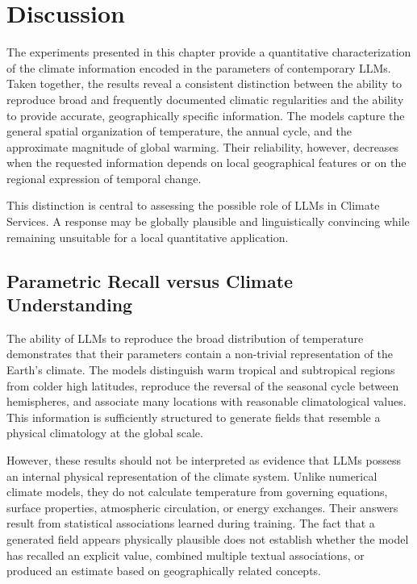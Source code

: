 \section{Discussion}

The experiments presented in this chapter provide a quantitative characterization of the climate information encoded in the parameters of contemporary LLMs. Taken together, the results reveal a consistent distinction between the ability to reproduce broad and frequently documented climatic regularities and the ability to provide accurate, geographically specific information. The models capture the general spatial organization of temperature, the annual cycle, and the approximate magnitude of global warming. Their reliability, however, decreases when the requested information depends on local geographical features or on the regional expression of temporal change.

This distinction is central to assessing the possible role of LLMs in Climate Services. A response may be globally plausible and linguistically convincing while remaining unsuitable for a local quantitative application.


\subsection{Parametric Recall versus Climate Understanding}

The ability of LLMs to reproduce the broad distribution of temperature demonstrates that their parameters contain a non-trivial representation of the Earth's climate. The models distinguish warm tropical and subtropical regions from colder high latitudes, reproduce the reversal of the seasonal cycle between hemispheres, and associate many locations with reasonable climatological values. This information is sufficiently structured to generate fields that resemble a physical climatology at the global scale.

However, these results should not be interpreted as evidence that LLMs possess an internal physical representation of the climate system. Unlike numerical climate models, they do not calculate temperature from governing equations, surface properties, atmospheric circulation, or energy exchanges. Their answers result from statistical associations learned during training. The fact that a generated field appears physically plausible does not establish whether the model has recalled an explicit value, combined multiple textual associations, or produced an estimate based on geographically related concepts.

